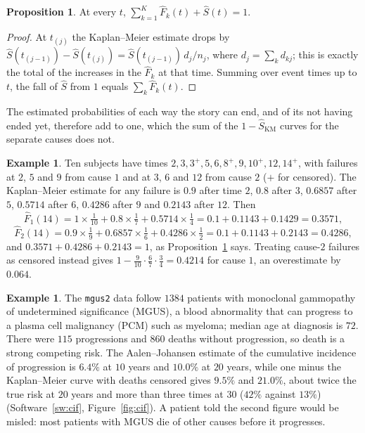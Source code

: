 \documentclass[11pt,a4paper]{article}
\numberwithin{equation}{section}
\theoremstyle{definition}
\newtheorem{exa}[thm]{Example}
\newtheorem{prop}[thm]{Proposition}
\begin{document}
\begin{prop}
\label{prop:cifsum}
At every $t$, $\sum_{k=1}^K\hat F_k(t) + \hat S(t) = 1$.
\end{prop}

\begin{proof}
At $t_{(j)}$ the Kaplan--Meier estimate drops by $\hat S(t_{(j-1)}) - \hat S(t_{(j)}) = \hat S(t_{(j-1)})\,d_j/n_j$, where $d_j = \sum_kd_{kj}$; this is exactly the total of the increases in the $\hat F_k$ at that time. Summing over event times up to $t$, the fall of $\hat S$ from $1$ equals $\sum_k\hat F_k(t)$.
\end{proof}

The estimated probabilities of each way the story can end, and of its not having ended yet, therefore add to one, which the sum of the $1 - \hat S_{\text{KM}}$ curves for the separate causes does not.

\begin{exa}
\label{ex:cifhand}
Ten subjects have times $2, 3, 3^+, 5, 6, 8^+, 9, 10^+, 12, 14^+$, with failures at $2$, $5$ and $9$ from cause $1$ and at $3$, $6$ and $12$ from cause $2$ ($+$ for censored). The Kaplan--Meier estimate for any failure is $0.9$ after time $2$, $0.8$ after $3$, $0.6857$ after $5$, $0.5714$ after $6$, $0.4286$ after $9$ and $0.2143$ after $12$. Then
\[
\hat F_1(14) = 1 \times \tfrac1{10} + 0.8 \times \tfrac17 + 0.5714 \times \tfrac14 = 0.1 + 0.1143 + 0.1429 = 0.3571 ,
\]
\[
\hat F_2(14) = 0.9 \times \tfrac19 + 0.6857 \times \tfrac16 + 0.4286 \times \tfrac12 = 0.1 + 0.1143 + 0.2143 = 0.4286 ,
\]
and $0.3571 + 0.4286 + 0.2143 = 1$, as Proposition~\ref{prop:cifsum} says. Treating cause-$2$ failures as censored instead gives $1 - \frac9{10}\cdot\frac67\cdot\frac34 = 0.4214$ for cause $1$, an overestimate by $0.064$.
\end{exa}

\begin{exa}
\label{ex:mgus}
The \texttt{mgus2} data follow $1384$ patients with monoclonal gammopathy of undetermined significance (MGUS), a blood abnormality that can progress to a plasma cell malignancy (PCM) such as myeloma; median age at diagnosis is $72$. There were $115$ progressions and $860$ deaths without progression, so death is a strong competing risk. The Aalen--Johansen estimate of the
cumulative incidence of progression is $6.4\%$ at $10$ years and $10.0\%$ at $20$ years, while one minus the Kaplan--Meier curve with deaths censored gives $9.5\%$ and $21.0\%$, about twice the true risk at $20$ years and more than three times at $30$ ($42\%$ against $13\%$) (Software~\ref{sw:cif}, Figure~\ref{fig:cif}). A patient told the second figure would be misled: most patients with MGUS die of other causes before it progresses.
\end{exa}
\end{document}

